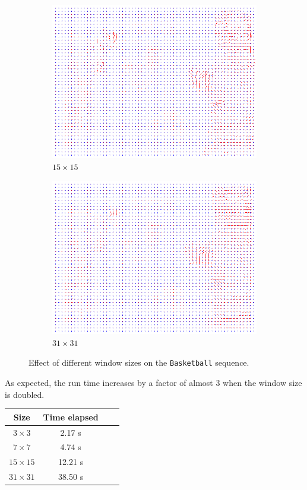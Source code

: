 \documentclass[a4paper,11]{article}
\begin{document}
  \begin{figure}[H]\ContinuedFloat
  \begin{subfigure}{0.5\textwidth}
   \centering
   \includegraphics[width=0.8\linewidth]{Basketball/flow_15x15.png}
   \caption{$15 \times 15$}
   \end{subfigure}
   \begin{subfigure}{0.5\textwidth}
    \centering
    \includegraphics[width=0.8\linewidth]{Basketball/flow_31x31.png}
    \caption{$31 \times 31$}
   \end{subfigure}
  \caption{Effect of different window sizes on the \texttt{Basketball} sequence.}
\end{figure}

As expected, the run time increases by a factor of almost $3$ when the window size is doubled.

  \begin{center}
   \begin{tabular}{|c|c|c|c|}
      \hline
      \textbf{Size} & Time elapsed\\
      \hline
      $3 \times 3$& 2.17 s\\
      \hline
      $7 \times 7$ & 4.74 s\\
      \hline
      $15 \times 15$ & 12.21 s\\
      \hline
      $31 \times 31$ & 38.50 s\\
      \hline
   \end{tabular}
   \end{center}
   
\end{document}
